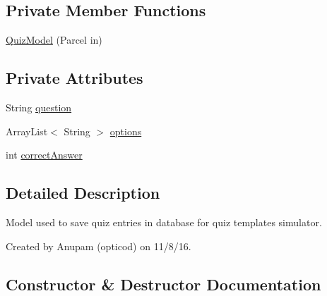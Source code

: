 \subsection*{Private Member Functions}
\begin{DoxyCompactItemize}
\item 
\hyperlink{classorg_1_1buildmlearn_1_1toolkit_1_1quiztemplate_1_1data_1_1QuizModel_a660859aa98e529ff042015e76973f39c}{Quiz\+Model} (Parcel in)
\end{DoxyCompactItemize}
\subsection*{Private Attributes}
\begin{DoxyCompactItemize}
\item 
String \hyperlink{classorg_1_1buildmlearn_1_1toolkit_1_1quiztemplate_1_1data_1_1QuizModel_a4e88fb6898a62a5b7b7260f505a07b4b}{question}
\item 
Array\+List$<$ String $>$ \hyperlink{classorg_1_1buildmlearn_1_1toolkit_1_1quiztemplate_1_1data_1_1QuizModel_a33236011db95b7a1abea3b71d17df01b}{options}
\item 
int \hyperlink{classorg_1_1buildmlearn_1_1toolkit_1_1quiztemplate_1_1data_1_1QuizModel_aee2382f372a1dcd51eb3f6ce841eb646}{correct\+Answer}
\end{DoxyCompactItemize}


\subsection{Detailed Description}
Model used to save quiz entries in database for quiz template\textquotesingle{}s simulator. 

Created by Anupam (opticod) on 11/8/16. 

\subsection{Constructor \& Destructor Documentation}
